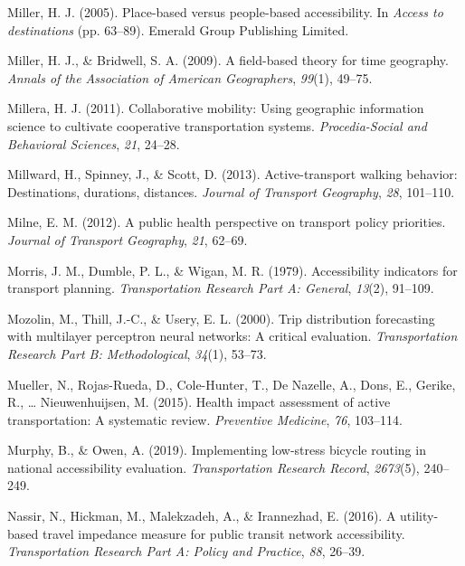 \documentclass[
11pt, %
oneside, %
english, %
singlespacing, %
]{macthesis} %
\newlength{\cslhangindent}
\newenvironment{CSLReferences}[2] %
{\begin{list}{}{%
	\setlength{\itemindent}{0pt}
	\setlength{\leftmargin}{0pt}
	\setlength{\parsep}{0pt}
	\ifodd #1
	\setlength{\leftmargin}{\cslhangindent}
	\setlength{\itemindent}{-1\cslhangindent}
	\fi
	\setlength{\itemsep}{#2\baselineskip}}}
{\end{list}}
\begin{document}
\begin{CSLReferences}{1}{0}
Miller, H. J. (2005). Place-based versus people-based accessibility. In \emph{Access to destinations} (pp. 63--89). Emerald Group Publishing Limited.

Miller, H. J., \& Bridwell, S. A. (2009). A field-based theory for time geography. \emph{Annals of the Association of American Geographers}, \emph{99}(1), 49--75.

Millera, H. J. (2011). Collaborative mobility: Using geographic information science to cultivate cooperative transportation systems. \emph{Procedia-Social and Behavioral Sciences}, \emph{21}, 24--28.

Millward, H., Spinney, J., \& Scott, D. (2013). Active-transport walking behavior: Destinations, durations, distances. \emph{Journal of Transport Geography}, \emph{28}, 101--110.

Milne, E. M. (2012). A public health perspective on transport policy priorities. \emph{Journal of Transport Geography}, \emph{21}, 62--69.

Morris, J. M., Dumble, P. L., \& Wigan, M. R. (1979). Accessibility indicators for transport planning. \emph{Transportation Research Part A: General}, \emph{13}(2), 91--109.

Mozolin, M., Thill, J.-C., \& Usery, E. L. (2000). Trip distribution forecasting with multilayer perceptron neural networks: A critical evaluation. \emph{Transportation Research Part B: Methodological}, \emph{34}(1), 53--73.

Mueller, N., Rojas-Rueda, D., Cole-Hunter, T., De Nazelle, A., Dons, E., Gerike, R., \ldots{} Nieuwenhuijsen, M. (2015). Health impact assessment of active transportation: A systematic review. \emph{Preventive Medicine}, \emph{76}, 103--114.

Murphy, B., \& Owen, A. (2019). Implementing low-stress bicycle routing in national accessibility evaluation. \emph{Transportation Research Record}, \emph{2673}(5), 240--249.

Nassir, N., Hickman, M., Malekzadeh, A., \& Irannezhad, E. (2016). A utility-based travel impedance measure for public transit network accessibility. \emph{Transportation Research Part A: Policy and Practice}, \emph{88}, 26--39.


\end{CSLReferences}
\end{document}
